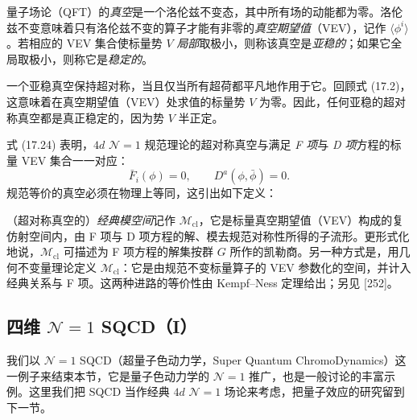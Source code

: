 
\begin{definition}[17.27]
量子场论（QFT）的\emph{真空}是一个洛伦兹不变态，其中所有场的动能都为零。洛伦兹不变意味着只有洛伦兹不变的算子才能有非零的\emph{真空期望值}（VEV），记作 $\langle\phi^i\rangle$。若相应的 VEV 集合使标量势 $V$ \emph{局部}取极小，则称该真空是\emph{亚稳的}；如果它全局取极小，则称它是\emph{稳定的}。
\end{definition}

一个亚稳真空保持超对称，当且仅当所有超荷都平凡地作用于它。回顾式 (17.2)，这意味着在真空期望值（VEV）处求值的标量势 $V$ 为零。因此，任何亚稳的超对称真空都是真正稳定的，因为势 $V$ 半正定。

式 (17.24) 表明，$4d$ $\mathcal{N}=1$ 规范理论的超对称真空与满足 \emph{F 项}与 \emph{D 项}方程的标量 VEV 集合一一对应：
\[
\bar F_i(\phi)=0,\qquad D^a(\phi,\bar\phi)=0.
\]
规范等价的真空必须在物理上等同，这引出如下定义：

\begin{definition}[17.28]
（超对称真空的）\emph{经典模空间}记作 $\mathcal{M}_{\mathrm{cl}}$，它是标量真空期望值（VEV）构成的复仿射空间内，由 F 项与 D 项方程的解、模去规范对称性所得的子流形。更形式化地说，$\mathcal{M}_{\mathrm{cl}}$ 可描述为 F 项方程的解集按群 $G$ 所作的凯勒商。另一种方式是，用几何不变量理论定义 $\mathcal{M}_{\mathrm{cl}}$：它是由规范不变标量算子的 VEV 参数化的空间，并计入经典关系与 F 项。这两种进路的等价性由 Kempf--Ness 定理给出；另见 [252]。
\end{definition}

\subsection{四维 $\mathcal{N}=1$ SQCD（I）}

我们以 $\mathcal{N}=1$ SQCD（超量子色动力学，Super Quantum ChromoDynamics）这一例子来结束本节，它是量子色动力学的 $\mathcal{N}=1$ 推广，也是一般讨论的丰富示例。这里我们把 SQCD 当作经典 $4d$ $\mathcal{N}=1$ 场论来考虑，把量子效应的研究留到下一节。

